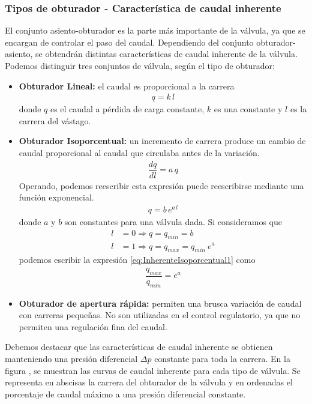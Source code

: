 \subsubsection{Tipos de obturador - Característica de caudal inherente}
El conjunto asiento-obturador es la parte más importante de la válvula, ya que
se encargan de controlar el paso del caudal.
Dependiendo del conjunto obturador-asiento, se obtendrán distintas
características de caudal inherente de la válvula.
Podemos distinguir tres conjuntos de válvula, según el tipo de obturador:
\begin{itemize}
  \item \textbf{Obturador Lineal:} el caudal es proporcional a la carrera
  \begin{align}
	q = k\,l
	\label{eq:inherenteLineal}
  \end{align}
  donde $q$ es el caudal a pérdida de carga constante, $k$ es una constante y
$l$ es la carrera del vástago.

  \item \textbf{Obturador Isoporcentual:}
  un incremento de carrera produce un cambio de caudal proporcional al caudal
que circulaba antes de la variación.
  \begin{align}
    \dfrac{dq}{dl} = a \, q
  \end{align}
  Operando, podemos reescribir esta expresión puede reescribirse mediante una
función exponencial.
\begin{align}
 q = b\,e^{a\,l}
 \label{eq:InherenteIsoporcentual1}
\end{align}
  donde $a$ y $b$ son constantes para una válvula dada.
  Si consideramos que
    \begin{align}
        l &= 0 \Rightarrow q = q_{min} = b\\
        l &= 1 \Rightarrow q = q_{max} = q_{min} \:e^a
    \end{align}
    podemos escribir la expresión \eqref{eq:InherenteIsoporcentual1} como
    \begin{align}
      \dfrac{q_{max}}{q_{min}} = e^a
    \end{align}
  \item \textbf{Obturador de apertura rápida:} permiten una brusca variación de
caudal con carreras pequeñas.
  No son utilizadas en el control regulatorio, ya que no permiten una
regulación fina del caudal.
\end{itemize}

Debemos destacar que las características de caudal inherente se obtienen
manteniendo una presión diferencial $\Delta p$ constante para toda la carrera.
En la figura , se muestran las curvas de caudal inherente para cada
tipo de válvula.
Se representa en abscisas la carrera del obturador de la válvula y
en ordenadas el porcentaje de caudal máximo a una presión diferencial constante.

